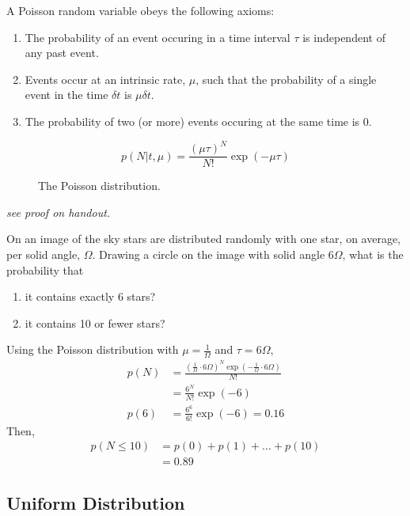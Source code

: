 \documentclass{dwnotes}         		        %
\begin{document}
A Poisson random variable obeys the following axioms:
\begin{enumerate}
\item The probability of an event occuring in a time interval $\tau$ is independent of any past event.
\item Events occur at an intrinsic rate, $\mu$, such that the probability of a single event in the time $\delta t$ is $\mu \delta t$.
\item The probability of two (or more) events occuring at the same time is $0$.
\end{enumerate}
\begin{equation}
  \label{eq:poisson}
  p(N|t, \mu) = \frac{(\mu\tau)^N}{N!} \exp(-\mu \tau)
\end{equation}
\begin{figure}
  \centering
  
  \caption{The Poisson distribution.}
  \label{fig:poisson}
\end{figure}
{\em see proof on handout.}\\
\begin{example}
  On an image of the sky stars are distributed randomly with one star,
  on average, per solid angle, $\Omega$.  Drawing a circle on the
  image with solid angle $6\Omega$, what is the probability that
  \begin{enumerate}
  \item it contains exactly 6 stars?
  \item it contains 10 or fewer stars?
  \end{enumerate}

  Using the Poisson distribution with $\mu = \frac{1}{\Omega}$ and
  $\tau = 6\Omega{}$, 
\begin{align*} p(N) &= \frac{\left( \frac{1}{\Omega} \cdot 6\Omega\right)^{N} \exp\left( -\frac{1}{\Omega}\cdot 6\Omega \right)}{N!} \\ &= \frac{6^N}{N!} \exp(-6) \\ p(6) &= \frac{6^6}{6!} \exp(-6) = 0.16
\end{align*}
Then, 
\begin{align*}p(N \le 10) &= p(0) + p(1) + \dots + p(10) \\ &= 0.89
\end{align*}
\end{example}

\subsection{Uniform Distribution}
\label{sec:uniform}
\end{document}
